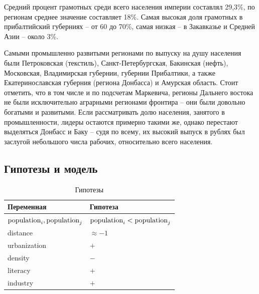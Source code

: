 \documentclass[a4paper,12pt]{article}
\begin{document}
Средний процент грамотных среди всего населения империи составлял 29,3\%, по регионам среднее значение составляет 18\%. Самая высокая доля грамотных в прибалтийский губерниях – от 60 до 70\%, самая низкая – в Закавказье и Средней Азии – около 3\%.

Самыми промышленно развитыми регионами по выпуску на душу населения были Петроковская (текстиль), Санкт-Петербургская, Бакинская (нефть), Московская, Владимирская губернии, губернии Прибалтики, а также Екатеринославская губерния (региона Донбасса) и Амурская область. Стоит отметить, что в том числе и по подсчетам Маркевича, регионы Дальнего востока не были исключительно аграрными регионами фронтира – они были довольно богатыми и развитыми. Если рассматривать долю населения, занятого в промышленности, лидеры остаются примерно такими же, однако перестают выделяться Донбасс и Баку – судя по всему, их высокий выпуск в рублях был заслугой небольшого числа рабочих, относительно всего населения.

\subsection{Гипотезы и модель}

\begin{table}[h]    
	\caption{Гипотезы}
	\label{table:hypo}
	\centering
	\begin{tabular}{@{}ll@{}}
		\toprule
		Переменная                   & Гипотеза                              \\ 
		\midrule
		$\textup{population}_i, \textup{population}_j$ & $\textup{population}_i < \textup{population}_j$ \\
		distance                     & $\approx-1$                            \\
		urbanization                 & $+$                                    \\
		density                      & $-$                                    \\
		literacy                     & $+$                                    \\
		industry                     & $+$                                    \\
		\bottomrule
	\end{tabular}
\end{table}
\end{document}
